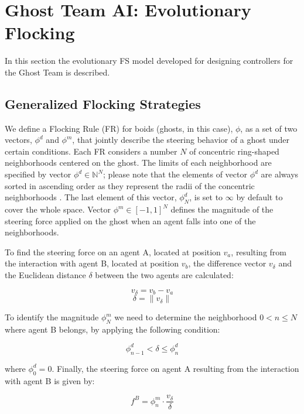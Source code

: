 \documentclass{llncs}
\begin{document}
%
%

\section{Ghost Team AI: Evolutionary Flocking}
\label{sec:ghosts_ai}
In this section the evolutionary FS model developed for designing controllers for the Ghost Team is described.
\subsection{Generalized Flocking Strategies}
\label{subsec:flocking_strategies}
We define a Flocking Rule (FR) for boids (ghosts, in this case), $\phi$, as a set of two vectors, $\phi^d$ and $\phi^m$, that jointly describe the steering behavior of a ghost under certain conditions. Each FR considers a number $N$ of concentric ring-shaped neighborhoods centered on the ghost. The limits of each neighborhood are specified by vector $\phi^d \in \mathbb{N}^N$; please note that the elements of vector $\phi^d$ are always sorted in ascending order as they represent the radii of the concentric neighborhoods . The last element of this vector, $\phi_N^d$, is set to $\infty$ by default to cover the whole space. Vector $\phi^m \in [-1, 1]^N$ defines the magnitude of the steering force applied on the ghost when an agent falls into one of the neighborhoods.

To find the steering force on an agent A, located at position $v_a$, resulting from the interaction with agent B, located at position $v_b$, the difference vector $v_\delta$ and the Euclidean distance $\delta$ between the two agents are calculated:
\begin{small}
\begin{equation}
	\label{eq:v_delta}
	v_\delta=v_b-v_a
\end{equation}
\begin{equation}
	\label{eq:delta}
	\delta=\|v_\delta\|
\end{equation}
\end{small}
To identify the magnitude $\phi^m_N$ we need to determine the neighborhood $0<n\leq N$ where agent B belongs, by applying the following condition:
\begin{small}
\begin{equation}
	\label{eq:neighborhood}
	\phi^d_{n-1} < \delta \leq \phi^d_{n}
\end{equation}
\end{small}
where $\phi^d_0 = 0$. Finally, the steering force on agent A resulting from the interaction with agent B is given by:
\begin{small}
\begin{equation}
	\label{eq:force}
	f^{B} = \phi^m_n \cdot \frac{v_\delta}{\delta}
\end{equation}
\end{small}
\end{document}
